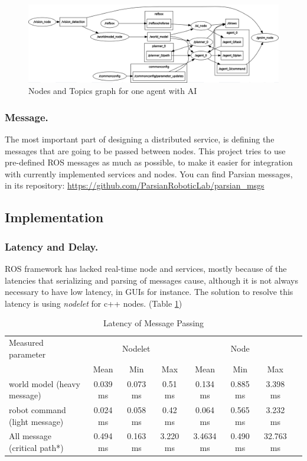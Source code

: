 \documentclass{llncs}
\begin{document}
\begin{figure}
\includegraphics[width=\textwidth]{img/ai3}
\caption{Nodes and Topics graph for one agent with AI}
\label{fig:AI3}
\end{figure}

\subsubsection{Message.}
	  The most important part of designing a distributed service, is defining the messages that are going to be passed between nodes. This project tries to use pre-defined ROS messages as much as possible, to make it easier for integration with currently implemented services and nodes. You can find Parsian messages, in its repository: \url{https://github.com/ParsianRoboticLab/parsian_msgs}

\subsection{Implementation}
\label{subsec:Implementation}
\subsubsection{Latency and Delay.}
\label{subsubsec:LAtencyAndDelay}
ROS framework has lacked real-time node and services, mostly because of the latencies that serializing and parsing of messages cause, although it is not always necessary to have low latency, in GUIs for instance. The solution to resolve this latency is using \textit{nodelet} for c++ nodes. (Table \ref{tab:l})
\begin{table}
\caption{Latency of Message Passing}\label{tab:l}
\begin{center}
\begin{tabular}{l|ccc|cccl}
\hline
\multicolumn{1}{l|}{\rule{0pt}{20pt}Measured parameter} & \multicolumn{3}{c|}{Nodelet} & \multicolumn{3}{c}{Node}\\[2pt]
& Mean & Min & Max & Mean & Min & Max \\[3pt]
\hline
world model (heavy message) & 0.039 ms &  0.073 ms & 0.51 ms &
0.134 ms & 0.885 ms & 3.398 ms  \\[3pt]
robot command (light message) & 0.024 ms &  0.058 ms & 0.42 ms 
& 0.064 ms & 0.565 ms & 3.232 ms\\[3pt]
All message (critical path*) & 0.494 ms  & 0.163 ms & 3.220 ms & 3.4634 ms & 0.490 ms  & 32.763 ms\\[2pt]

\hline
\end{tabular}
\end{center}
\end{table}
\end{document}
